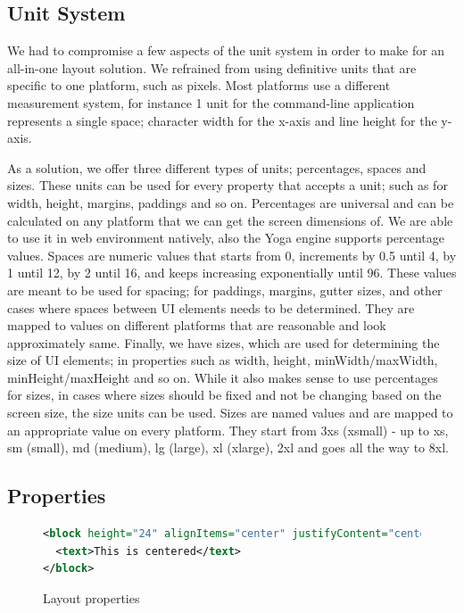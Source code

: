\subsection{Unit System}

We had to compromise a few aspects of the unit system in order to make for an all-in-one layout solution. We refrained from using definitive units that are specific to one platform, such as pixels. Most platforms use a different measurement system, for instance 1 unit for the command-line application represents a single space; character width for the x-axis and line height for the y-axis.

As a solution, we offer three different types of units; percentages, spaces and sizes. These units can be used for every property that accepts a unit; such as for width, height, margins, paddings and so on. Percentages are universal and can be calculated on any platform that we can get the screen dimensions of. We are able to use it in web environment natively, also the Yoga engine supports percentage values. Spaces are numeric values that starts from 0, increments by 0.5 until 4, by 1 until 12, by 2 until 16, and keeps increasing exponentially until 96. These values are meant to be used for spacing; for paddings, margins, gutter sizes, and other cases where spaces between UI elements needs to be determined. They are mapped to values on different platforms that are reasonable and look approximately same. Finally, we have sizes, which are used for determining the size of UI elements; in properties such as width, height, minWidth/maxWidth, minHeight/maxHeight and so on. While it also makes sense to use percentages for sizes, in cases where sizes should be fixed and not be changing based on the screen size, the size units can be used. Sizes are named values and are mapped to an appropriate value on every platform. They start from 3xs (xsmall) - up to xs, sm (small), md (medium), lg (large), xl (xlarge), 2xl and goes all the way to 8xl.

\subsection{Properties}

\begin{figure}[H]
\begin{minipage}{\linewidth}
\begin{lstlisting}[language=xml]
<block height="24" alignItems="center" justifyContent="center">
  <text>This is centered</text>
</block>
\end{lstlisting}
\end{minipage}
\caption{Layout properties}%
\label{fig:layout_props_example}%
\end{figure}

